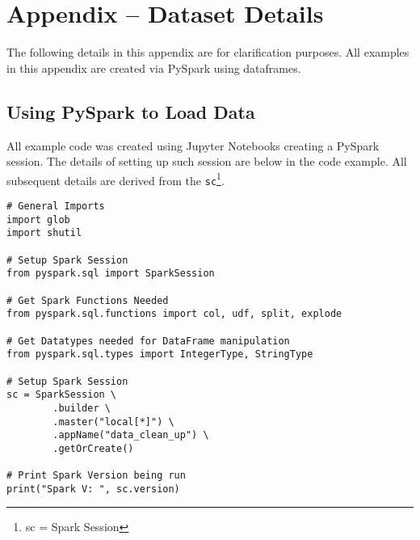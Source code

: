 \section{Appendix -- Dataset Details}
The following details in this appendix are for clarification purposes.
All examples in this appendix are created via PySpark using dataframes.

\subsection{Using PySpark to Load Data}
All example code was created using Jupyter Notebooks creating a PySpark session. The details of setting up such session are below in the code example. All subsequent details are derived from the \texttt{sc}\footnote{sc = Spark Session}.
\begin{verbatim}
# General Imports
import glob
import shutil

# Setup Spark Session
from pyspark.sql import SparkSession

# Get Spark Functions Needed
from pyspark.sql.functions import col, udf, split, explode

# Get Datatypes needed for DataFrame manipulation
from pyspark.sql.types import IntegerType, StringType

# Setup Spark Session
sc = SparkSession \
        .builder \
        .master("local[*]") \
        .appName("data_clean_up") \
        .getOrCreate()

# Print Spark Version being run
print("Spark V: ", sc.version)
\end{verbatim}
\clearpage


